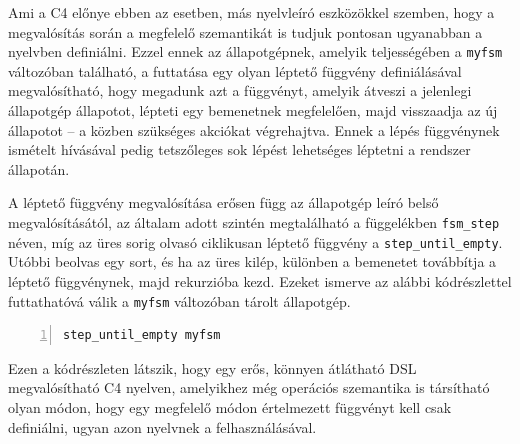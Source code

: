 Ami a C4 előnye ebben az esetben, más nyelvleíró eszközökkel szemben, hogy a megvalósítás során a megfelelő szemantikát is tudjuk pontosan ugyanabban a nyelvben definiálni.
Ezzel ennek az állapotgépnek, amelyik teljességében a {\tt myfsm} változóban található, a futtatása egy olyan léptető függvény definiálásával megvalósítható, hogy megadunk azt a függvényt, amelyik átveszi a jelenlegi állapotgép állapotot, lépteti egy bemenetnek megfelelően, majd visszaadja az új állapotot -- a közben szükséges akciókat végrehajtva.
Ennek a lépés függvénynek ismételt hívásával pedig tetszőleges sok lépést lehetséges léptetni a rendszer állapotán.

A léptető függvény megvalósítása erősen függ az állapotgép leíró belső megvalósításától, az általam adott szintén megtalálható a függelékben {\tt fsm\_step} néven, míg az üres sorig olvasó ciklikusan léptető függvény a {\tt step\_until\_empty}.
Utóbbi beolvas egy sort, és ha az üres kilép, különben a bemenetet továbbítja a léptető függvénynek, majd rekurzióba kezd.
Ezeket ismerve az alábbi kódrészlettel futtathatóvá válik a {\tt myfsm} változóban tárolt állapotgép.

\begin{lstlisting}[gobble=2,numbers=left]
	step_until_empty myfsm
\end{lstlisting}

Ezen a kódrészleten látszik, hogy egy erős, könnyen átlátható \gls{DSL} megvalósítható C4 nyelven, amelyikhez még operációs szemantika is társítható olyan módon, hogy egy megfelelő módon értelmezett függvényt kell csak definiálni, ugyan azon nyelvnek a felhasználásával.



























